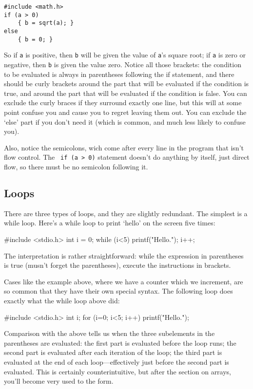 \documentclass[12pt]{article}
\makeatletter
\def\ttindex#1{\index{#1@{\tt #1}}}
\makeatother
\begin{document}
\begin{verbatim}
#include <math.h>
if (a > 0)
    { b = sqrt(a); }
else 
    { b = 0; }
\end{verbatim}
So if {\tt a} is positive, then {\tt b} will be given the value of {\tt a}'s square root; if {\tt a} is
zero or negative, then {\tt b} is given the value zero. Notice all those brackets: the condition to be
evaluated is always in parentheses following the if statement, and there should be curly brackets around
the part that will be evaluated if the condition is true, and around the part that will be evaluated if
the condition is false. You can exclude the curly braces if they surround exactly one line, but this
will at some point confuse you and cause you to regret leaving them out.
You can exclude the `else' part if you don't need it (which is common, and much less likely to confuse you).

Also, notice the semicolons, wich come after every line in the program that isn't flow control. The {\tt
if (a > 0)} statement doesn't do anything by itself, just direct flow, so there must be no semicolon following
it.

\subsection{Loops} There are three types of loops, and they are slightly redundant. The simplest is a while
loop. Here's a while loop to print `hello' on the screen five times:  \ttindex{while}

#include <stdio.h>
int i = 0;
while (i<5){
    printf("Hello.\n");
    i++;
}

The interpretation is rather straightforward: while the expression in parentheses is true (musn't forget
the parentheses), execute the instructions in brackets.

Cases like the example above, where we have a counter which we increment, are so common that they have
their own special syntax. The following  loop does exactly what the while loop above did:

#include <stdio.h>
int i;
for (i=0; i<5; i++){
    printf("Hello.\n");
}

Comparison with the above tells us when the three subelements in the parentheses are evaluated: the first
part is evaluated before the loop runs; the second part is evaluated after each iteration of the loop; the
third part is evaluated at the end of each loop---effectively just before the second part is evaluated.
This is certainly counterintuitive, but after the section on arrays, you'll become very used to the form.
\end{document}

